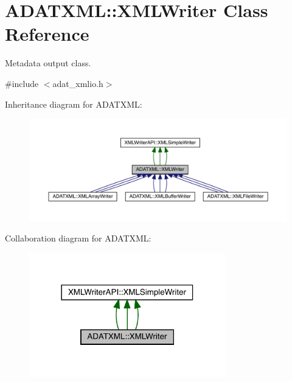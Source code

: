 \hypertarget{classADATXML_1_1XMLWriter}{}\section{A\+D\+A\+T\+X\+ML\+:\+:X\+M\+L\+Writer Class Reference}
\label{classADATXML_1_1XMLWriter}


Metadata output class.  




{\ttfamily \#include $<$adat\+\_\+xmlio.\+h$>$}



Inheritance diagram for A\+D\+A\+T\+X\+ML\+:
\nopagebreak
\begin{figure}[H]
\begin{center}
\leavevmode
\includegraphics[width=350pt]{dd/d9f/classADATXML_1_1XMLWriter__inherit__graph}
\end{center}
\end{figure}


Collaboration diagram for A\+D\+A\+T\+X\+ML\+:
\nopagebreak
\begin{figure}[H]
\begin{center}
\leavevmode
\includegraphics[width=242pt]{df/d4f/classADATXML_1_1XMLWriter__coll__graph}
\end{center}
\end{figure}
